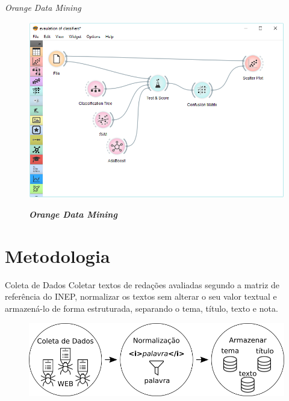 \documentclass[10pt]{beamer}
\begin{document}
  \begin{frame}[fragile]{\textit{Orange Data Mining}}
    \begin{figure}[H]
    \begin{center}
        \includegraphics[scale=0.35]{images/orange_canvas.png}
    \end{center}
    \begin{center}
    \textbf{\textit{Orange Data Mining}}
    \end{center}
    \end{figure}
  \end{frame}



\section{Metodologia}
  \begin{frame}[fragile]{Coleta de Dados}
  Coletar textos de redações avaliadas segundo a matriz de referência do INEP, normalizar os textos sem alterar o seu valor textual e armazená-lo de forma estruturada, separando o tema, título, texto e nota.
  \begin{figure}[H]
  \begin{center}
      \includegraphics[scale=0.50]{images/methodology_1.png}
  \end{center}
  \end{figure}

  \end{frame}
\end{document}
